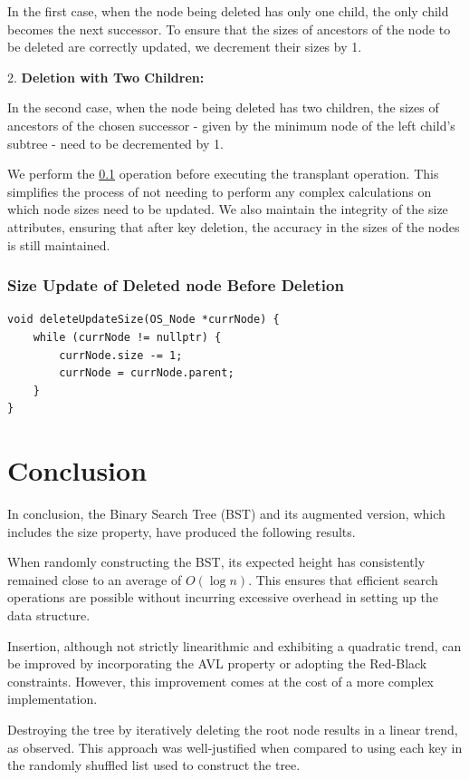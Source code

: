\documentclass[a4paper,twoside,12pt]{report}
\begin{document}
In the first case, when the node being deleted has only one child, the only child becomes the next successor. To ensure that the sizes of ancestors of the node to be deleted are correctly updated, we decrement their sizes by 1.

2. \textbf{Deletion with Two Children:}

In the second case, when the node being deleted has two children, the sizes of ancestors of the chosen successor - given by the minimum node of the left child's subtree - need to be decremented by 1. 

We perform the \ref{deleteUpdate} operation before executing the transplant operation. This simplifies the process of not needing to perform any complex calculations on which node sizes need to be updated. We also maintain the integrity of the size attributes, ensuring that after key deletion, the accuracy in the sizes of the nodes is still maintained.

\subsection{Size Update of Deleted node Before Deletion} \label{deleteUpdate}
\begin{lstlisting}[style=mystyle] 
void deleteUpdateSize(OS_Node *currNode) {
	while (currNode != nullptr) {
		currNode.size -= 1;
		currNode = currNode.parent;
	}
}
\end{lstlisting}


\chapter{Conclusion}
In conclusion, the Binary Search Tree (BST) and its augmented version, which includes the size property, have produced the following results.

When randomly constructing the BST, its expected height has consistently remained close to an average of $O(\log n)$. This ensures that efficient search operations are possible without incurring excessive overhead in setting up the data structure.

Insertion, although not strictly linearithmic and exhibiting a quadratic trend, can be improved by incorporating the AVL property or adopting the Red-Black constraints. However, this improvement comes at the cost of a more complex implementation.

Destroying the tree by iteratively deleting the root node results in a linear trend, as observed. This approach was well-justified when compared to using each key in the randomly shuffled list used to construct the tree.
\end{document}
